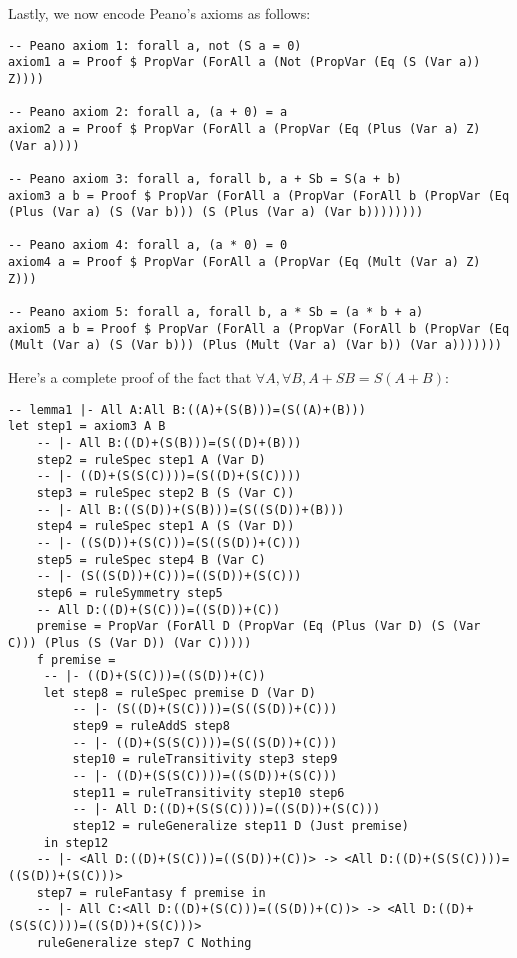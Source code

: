 \documentclass{article}
\begin{document}
Lastly, we now encode Peano’s axioms as follows:

\begin{lstlisting}
-- Peano axiom 1: forall a, not (S a = 0)
axiom1 a = Proof $ PropVar (ForAll a (Not (PropVar (Eq (S (Var a)) Z))))

-- Peano axiom 2: forall a, (a + 0) = a
axiom2 a = Proof $ PropVar (ForAll a (PropVar (Eq (Plus (Var a) Z) (Var a))))

-- Peano axiom 3: forall a, forall b, a + Sb = S(a + b)
axiom3 a b = Proof $ PropVar (ForAll a (PropVar (ForAll b (PropVar (Eq (Plus (Var a) (S (Var b))) (S (Plus (Var a) (Var b))))))))

-- Peano axiom 4: forall a, (a * 0) = 0
axiom4 a = Proof $ PropVar (ForAll a (PropVar (Eq (Mult (Var a) Z) Z)))

-- Peano axiom 5: forall a, forall b, a * Sb = (a * b + a)
axiom5 a b = Proof $ PropVar (ForAll a (PropVar (ForAll b (PropVar (Eq (Mult (Var a) (S (Var b))) (Plus (Mult (Var a) (Var b)) (Var a)))))))
\end{lstlisting}

Here's a complete proof of the fact that $\forall A, \forall B, A + S B = S(A + B)$:

\begin{lstlisting}
-- lemma1 |- All A:All B:((A)+(S(B)))=(S((A)+(B)))
let step1 = axiom3 A B
    -- |- All B:((D)+(S(B)))=(S((D)+(B)))
    step2 = ruleSpec step1 A (Var D)
    -- |- ((D)+(S(S(C))))=(S((D)+(S(C))))
    step3 = ruleSpec step2 B (S (Var C))
    -- |- All B:((S(D))+(S(B)))=(S((S(D))+(B)))
    step4 = ruleSpec step1 A (S (Var D))
    -- |- ((S(D))+(S(C)))=(S((S(D))+(C)))
    step5 = ruleSpec step4 B (Var C)
    -- |- (S((S(D))+(C)))=((S(D))+(S(C)))
    step6 = ruleSymmetry step5
    -- All D:((D)+(S(C)))=((S(D))+(C))
    premise = PropVar (ForAll D (PropVar (Eq (Plus (Var D) (S (Var C))) (Plus (S (Var D)) (Var C)))))
    f premise =
     -- |- ((D)+(S(C)))=((S(D))+(C))
     let step8 = ruleSpec premise D (Var D)
         -- |- (S((D)+(S(C))))=(S((S(D))+(C)))
         step9 = ruleAddS step8
         -- |- ((D)+(S(S(C))))=(S((S(D))+(C)))
         step10 = ruleTransitivity step3 step9
         -- |- ((D)+(S(S(C))))=((S(D))+(S(C)))
         step11 = ruleTransitivity step10 step6
         -- |- All D:((D)+(S(S(C))))=((S(D))+(S(C)))
         step12 = ruleGeneralize step11 D (Just premise)
     in step12
    -- |- <All D:((D)+(S(C)))=((S(D))+(C))> -> <All D:((D)+(S(S(C))))=((S(D))+(S(C)))>
    step7 = ruleFantasy f premise in
    -- |- All C:<All D:((D)+(S(C)))=((S(D))+(C))> -> <All D:((D)+(S(S(C))))=((S(D))+(S(C)))>
    ruleGeneralize step7 C Nothing
\end{lstlisting}
\end{document}
